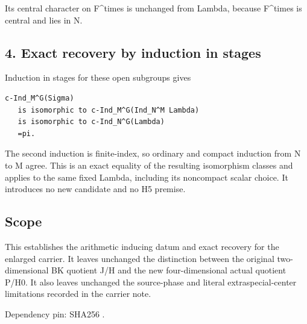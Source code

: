 Its central character on F\^{}times is unchanged from Lambda, because
F\^{}times is central and lies in N.

\hypertarget{rank4_stages-exact-recovery-by-induction-in-stages}{%
\subsection{4. Exact recovery by induction in
stages}\label{rank4_stages-exact-recovery-by-induction-in-stages}}

Induction in stages for these open subgroups gives

\begin{Verbatim}[fontsize=\small,breaklines=true,breakanywhere=true]
c-Ind_M^G(Sigma)
   is isomorphic to c-Ind_M^G(Ind_N^M Lambda)
   is isomorphic to c-Ind_N^G(Lambda)
   =pi.
\end{Verbatim}

The second induction is finite-index, so ordinary and compact induction
from N to M agree. This is an exact equality of the resulting
isomorphism classes and applies to the same fixed Lambda, including its
noncompact scalar choice. It introduces no new candidate and no H5
premise.

\hypertarget{rank4_stages-scope}{%
\subsection{Scope}\label{rank4_stages-scope}}

This establishes the arithmetic inducing datum and exact recovery for
the enlarged carrier. It leaves unchanged the distinction between the
original two-dimensional BK quotient J/H and the new four-dimensional
actual quotient P/H0. It also leaves unchanged the source-phase and
literal extraspecial-center limitations recorded in the carrier note.

Dependency pin:  SHA256
.
